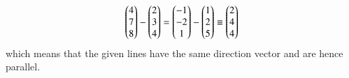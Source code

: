 \begin{align}
\begin{pmatrix}4 \\ 7 \\ 8\end{pmatrix}- \begin{pmatrix}2 \\ 3 \\ 4\end{pmatrix}= \begin{pmatrix}-1 \\ -2 \\ 1\end{pmatrix}- \begin{pmatrix}1 \\ 2 \\ 5\end{pmatrix}
\equiv \begin{pmatrix}2\\4\\4\end{pmatrix}
\end{align}
which means that the given lines have the same direction vector and are hence parallel.
